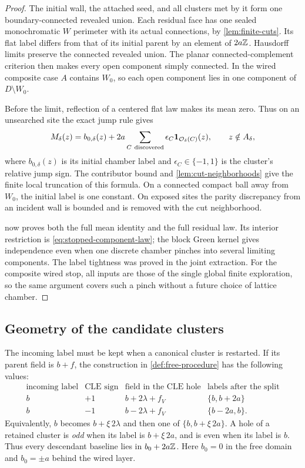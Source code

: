 \begin{proof}
The initial wall, the attached seed, and all clusters met by it form
one boundary-connected revealed union. Each residual face has one
sealed monochromatic \(W\) perimeter with its actual connections, by
\cref{lem:finite-cuts}. Its flat label differs from that of its initial
parent by an element of \(2a\mathbb Z\). Hausdorff limits preserve the
connected revealed union. The planar connected-complement criterion
then makes every open component simply connected. In the wired
composite case \(A\) contains \(W_0\), so each open component lies in
one component of \(D\setminus W_0\).

Before the limit, reflection of a centered flat law makes its mean
zero. Thus on an unsearched site the exact jump rule gives
\begin{equation}
 M_\delta(z)=b_{0,\delta}(z)+
       2a\sum_{C\ \mathrm{discovered}}
             \epsilon_C\mathbf 1_{\mathcal O_\delta(C)}(z),
 \qquad z\notin A_\delta,
 \label{eq:discrete-discovered-mean}
\end{equation}
where \(b_{0,\delta}(z)\) is its initial chamber label and
\(\epsilon_C\in\{-1,1\}\) is the cluster's relative jump sign.
The contributor bound and \cref{lem:cut-neighborhoods} give the
finite local truncation of this formula. On a connected compact
ball away from \(W_0\), the initial label is one constant. On exposed
sites the parity discrepancy from an incident wall is bounded and is
removed with the cut neighborhood.

 now proves both the full mean identity
and the full residual law. Its interior restriction is
\eqref{eq:stopped-component-law}; the block Green kernel gives
independence even when one discrete chamber pinches into several
limiting components. The label tightness was proved in the joint
extraction. For the composite wired stop, all inputs are those of
the single global finite exploration, so the same argument covers
such a pinch without a future choice of lattice chamber.
\end{proof}

\subsection{Geometry of the candidate clusters}

The incoming label must be kept when a canonical cluster is restarted.
If its parent field is \(b+f\), the construction in
\cref{def:free-procedure} has the following values:
\[
\begin{array}{c|c|c|c}
\text{incoming label}&\text{CLE sign}&\text{field in the CLE hole}
     &\text{labels after the split}\\ \hline
b&+1&b+2\lambda+f_V&\{b,b+2a\}\\
b&-1&b-2\lambda+f_V&\{b-2a,b\}.
\end{array}
\]
Equivalently, \(b\) becomes \(b+\xi\,2\lambda\) and then one of
\(\{b,b+\xi\,2a\}\). A hole of a retained cluster is \emph{odd}
when its label is \(b+\xi\,2a\), and is even when its label is \(b\).
Thus every descendant baseline lies in \(b_0+2a\mathbb Z\). Here
\(b_0=0\) in the free domain and \(b_0=\pm a\) behind the wired layer.

